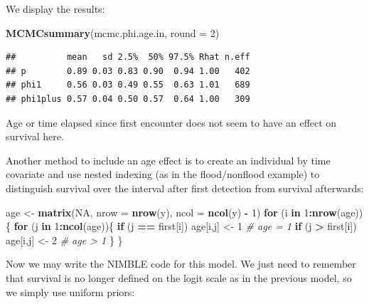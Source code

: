 \documentclass[
  12pt,
]{krantz}
\newenvironment{Shaded}{\begin{snugshade}}{\end{snugshade}}
\newcommand{\AttributeTok}[1]{\textcolor[rgb]{0.13,0.29,0.53}{#1}}
\newcommand{\CommentTok}[1]{\textcolor[rgb]{0.56,0.35,0.01}{\textit{#1}}}
\newcommand{\ConstantTok}[1]{\textcolor[rgb]{0.56,0.35,0.01}{#1}}
\newcommand{\ControlFlowTok}[1]{\textcolor[rgb]{0.13,0.29,0.53}{\textbf{#1}}}
\newcommand{\DecValTok}[1]{\textcolor[rgb]{0.00,0.00,0.81}{#1}}
\newcommand{\FunctionTok}[1]{\textcolor[rgb]{0.13,0.29,0.53}{\textbf{#1}}}
\newcommand{\NormalTok}[1]{#1}
\newcommand{\OtherTok}[1]{\textcolor[rgb]{0.56,0.35,0.01}{#1}}
\newcommand{\SpecialCharTok}[1]{\textcolor[rgb]{0.81,0.36,0.00}{\textbf{#1}}}
\begin{document}
We display the results:

\begin{Shaded}
\begin{Highlighting}[]
\FunctionTok{MCMCsummary}\NormalTok{(mcmc.phi.age.in, }\AttributeTok{round =} \DecValTok{2}\NormalTok{)}
\end{Highlighting}
\end{Shaded}

\begin{verbatim}
##          mean   sd 2.5%  50% 97.5% Rhat n.eff
## p        0.89 0.03 0.83 0.90  0.94 1.00   402
## phi1     0.56 0.03 0.49 0.55  0.63 1.01   689
## phi1plus 0.57 0.04 0.50 0.57  0.64 1.00   309
\end{verbatim}

Age or time elapsed since first encounter does not seem to have an effect on survival here.

Another method to include an age effect is to create an individual by time covariate and use nested indexing (as in the flood/nonflood example) to distinguish survival over the interval after first detection from survival afterwards:

\begin{Shaded}
\begin{Highlighting}[]
\NormalTok{age }\OtherTok{\textless{}{-}} \FunctionTok{matrix}\NormalTok{(}\ConstantTok{NA}\NormalTok{, }\AttributeTok{nrow =} \FunctionTok{nrow}\NormalTok{(y), }\AttributeTok{ncol =} \FunctionTok{ncol}\NormalTok{(y) }\SpecialCharTok{{-}} \DecValTok{1}\NormalTok{)}
\ControlFlowTok{for}\NormalTok{ (i }\ControlFlowTok{in} \DecValTok{1}\SpecialCharTok{:}\FunctionTok{nrow}\NormalTok{(age))\{}
  \ControlFlowTok{for}\NormalTok{ (j }\ControlFlowTok{in} \DecValTok{1}\SpecialCharTok{:}\FunctionTok{ncol}\NormalTok{(age))\{}
    \ControlFlowTok{if}\NormalTok{ (j }\SpecialCharTok{==}\NormalTok{ first[i]) age[i,j] }\OtherTok{\textless{}{-}} \DecValTok{1} \CommentTok{\# age = 1}
    \ControlFlowTok{if}\NormalTok{ (j }\SpecialCharTok{\textgreater{}}\NormalTok{ first[i]) age[i,j] }\OtherTok{\textless{}{-}} \DecValTok{2}  \CommentTok{\# age \textgreater{} 1}
\NormalTok{  \}}
\NormalTok{\}}
\end{Highlighting}
\end{Shaded}

Now we may write the NIMBLE code for this model. We just need to remember that survival is no longer defined on the logit scale as in the previous model, so we simply use uniform priors:
\end{document}
